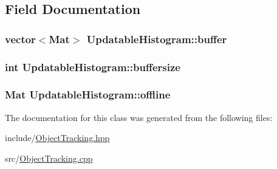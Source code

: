 \subsection{\-Field \-Documentation}
\hypertarget{classUpdatableHistogram_a18e0495a1aebebc1b0c0199a1ca725db}{
\subsubsection[{buffer}]{\setlength{\rightskip}{0pt plus 5cm}vector$<$\-Mat$>$ {\bf \-Updatable\-Histogram\-::buffer}}}\label{classUpdatableHistogram_a18e0495a1aebebc1b0c0199a1ca725db}
\hypertarget{classUpdatableHistogram_aa0cf3b5b3174764222da9a728a3b0fca}{
\subsubsection[{buffersize}]{\setlength{\rightskip}{0pt plus 5cm}int {\bf \-Updatable\-Histogram\-::buffersize}}}\label{classUpdatableHistogram_aa0cf3b5b3174764222da9a728a3b0fca}
\hypertarget{classUpdatableHistogram_a7c49e770fc9b5fc4542326ca39e7537b}{
\subsubsection[{offline}]{\setlength{\rightskip}{0pt plus 5cm}\-Mat {\bf \-Updatable\-Histogram\-::offline}}}\label{classUpdatableHistogram_a7c49e770fc9b5fc4542326ca39e7537b}


\-The documentation for this class was generated from the following files\-:\begin{DoxyCompactItemize}
\item 
include/\hyperlink{ObjectTracking_8hpp}{\-Object\-Tracking.\-hpp}\item 
src/\hyperlink{ObjectTracking_8cpp}{\-Object\-Tracking.\-cpp}\end{DoxyCompactItemize}
